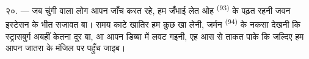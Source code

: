 २०. --- जब चुंगी वाला लोग आपन जाँच करत रहे, हम जँभाई लेत ओह
 \textsuperscript{(93)} के पढ़त रहनी जवन इस्टेसन के भीत
सजावत बा। समय काटे खातिर हम कुछ खा लेनी, जर्मन 
\textsuperscript{(94)} के नकसा देखनी कि स्ट्रासबुर्ग अबहीं केतना दूर बा,
आ आपन डिब्बा में लवट गइनी, एह आस से ताकत पाके कि जल्दिए हम आपन जातरा
के मंजिल पर पहुँच जाइब।
